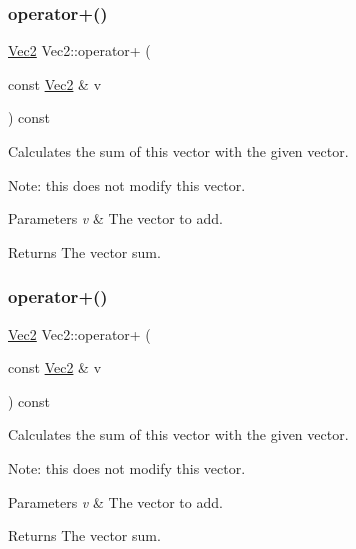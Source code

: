 \subsubsection{\texorpdfstring{operator+()}{operator+()}\hspace{0.1cm}{\footnotesize\ttfamily [1/2]}}
{\footnotesize\ttfamily \hyperlink{classVec2}{Vec2} Vec2\+::operator+ (\begin{DoxyParamCaption}\item[{const \hyperlink{classVec2}{Vec2} \&}]{v }\end{DoxyParamCaption}) const\hspace{0.3cm}{\ttfamily [inline]}}

Calculates the sum of this vector with the given vector.

Note\+: this does not modify this vector.


\begin{DoxyParams}{Parameters}
{\em v} & The vector to add. \\
\hline
\end{DoxyParams}
\begin{DoxyReturn}{Returns}
The vector sum. 
\end{DoxyReturn}
\mbox{\label{classVec2_ad2383d77974a8092b149391c2edce7fd}} 
\subsubsection{\texorpdfstring{operator+()}{operator+()}\hspace{0.1cm}{\footnotesize\ttfamily [2/2]}}
{\footnotesize\ttfamily \hyperlink{classVec2}{Vec2} Vec2\+::operator+ (\begin{DoxyParamCaption}\item[{const \hyperlink{classVec2}{Vec2} \&}]{v }\end{DoxyParamCaption}) const\hspace{0.3cm}{\ttfamily [inline]}}

Calculates the sum of this vector with the given vector.

Note\+: this does not modify this vector.


\begin{DoxyParams}{Parameters}
{\em v} & The vector to add. \\
\hline
\end{DoxyParams}
\begin{DoxyReturn}{Returns}
The vector sum. 
\end{DoxyReturn}
\mbox{\label{classVec2_a7f062667506f94bc207bdf492ca5b89c}} 
